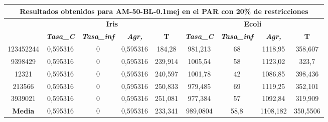 \documentclass[12pt, spanish]{article}
\begin{document}
\begin{table}[H]
\footnotesize
\begin{tabular}{|c|c|c|c|c|c|c|c|c|}
\hline
\multicolumn{9}{|c|}{\textbf{Resultados obtenidos para AM-50-BL-0.1mej en el PAR con 20\% de restricciones}}                                                                                                      \\ \hline
\multirow{2}{*}{} & \multicolumn{4}{c|}{\textbf{Iris}}                                                            & \multicolumn{4}{c|}{\textbf{Ecoli}}                                                           \\ \cline{2-9} 
                  & \textit{\textbf{Tasa\_C}} & \textit{\textbf{Tasa\_inf}} & \textit{\textbf{Agr,}} & \textbf{T} & \textit{\textbf{Tasa\_C}} & \textit{\textbf{Tasa\_inf}} & \textit{\textbf{Agr,}} & \textbf{T} \\ \hline
123452244         & 0,595316                  & 0                           & 0,595316               & 184,28     & 981,213                   & 68                          & 1118,95                & 358,607    \\ \hline
9398429           & 0,595316                  & 0                           & 0,595316               & 239,914    & 1005,54                   & 58                          & 1123,02                & 323,7      \\ \hline
12321             & 0,595316                  & 0                           & 0,595316               & 240,597    & 1001,78                   & 42                          & 1086,85                & 398,436    \\ \hline
213566            & 0,595316                  & 0                           & 0,595316               & 250,833    & 979,485                   & 69                          & 1119,25                & 352,101    \\ \hline
3939021           & 0,595316                  & 0                           & 0,595316               & 251,081    & 977,384                   & 57                          & 1092,84                & 319,909    \\ \hline
\textbf{Media}    & 0,595316                  & 0                           & 0,595316               & 233,341    & 989,0804                  & 58,8                        & 1108,182               & 350,5506   \\ \hline
\end{tabular}
\end{table}
\end{document}
